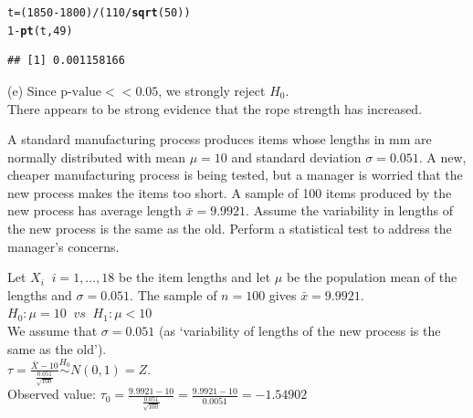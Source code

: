 \documentclass[bigtut]{tutorial}\usepackage[]{graphicx}\usepackage[]{color}
\makeatletter
\newcommand{\hlnum}[1]{\textcolor[rgb]{0.686,0.059,0.569}{#1}}%
\newcommand{\hlopt}[1]{\textcolor[rgb]{0,0,0}{#1}}%
\newcommand{\hlstd}[1]{\textcolor[rgb]{0.345,0.345,0.345}{#1}}%
\newcommand{\hlkwb}[1]{\textcolor[rgb]{0.69,0.353,0.396}{#1}}%
\newcommand{\hlkwd}[1]{\textcolor[rgb]{0.737,0.353,0.396}{\textbf{#1}}}%
\newenvironment{kframe}{%
 \def\at@end@of@kframe{}%
 \ifinner\ifhmode%
  \def\at@end@of@kframe{\end{minipage}}%
  \begin{minipage}{\columnwidth}%
 \fi\fi%
 \def\FrameCommand##1{\hskip\@totalleftmargin \hskip-\fboxsep
 \colorbox{shadecolor}{##1}\hskip-\fboxsep
     \hskip-\linewidth \hskip-\@totalleftmargin \hskip\columnwidth}%
 \MakeFramed {\advance\hsize-\width
   \@totalleftmargin\z@ \linewidth\hsize
   \@setminipage}}%
 {\par\unskip\endMakeFramed%
 \at@end@of@kframe}
\newenvironment{knitrout}{}{} %
\makeatother
\begin{document}
\begin{tutorial}
\begin{questions}
\begin{solution}
\begin{knitrout}
\color{fgcolor}\begin{kframe}
\begin{alltt}
\hlstd{t}\hlkwb{=}\hlstd{(}\hlnum{1850}\hlopt{-}\hlnum{1800}\hlstd{)}\hlopt{/}\hlstd{(}\hlnum{110}\hlopt{/}\hlkwd{sqrt}\hlstd{(}\hlnum{50}\hlstd{))}
\hlnum{1}\hlopt{-}\hlkwd{pt}\hlstd{(t,}\hlnum{49}\hlstd{)}
\end{alltt}
\begin{verbatim}
## [1] 0.001158166
\end{verbatim}
\end{kframe}
\end{knitrout}

\vspace{.5cm}
(e)
Since $\text{p-value} << 0.05$, we strongly reject $H_{0}$. \\
There appears to be strong evidence that the rope strength has increased.

\end{solution}



\question 
A standard manufacturing process produces items whose lengths in mm are normally distributed with mean $\mu=10$ and standard deviation $\sigma=0.051$. A new, cheaper manufacturing process is being tested, but a manager is worried that the new process makes the items too short. A sample of 100 items produced by the new process has average length $\bar{x}=9.9921$. Assume the variability in lengths of the new process is the same as the old.  Perform a statistical test to address the manager's concerns. 


\begin{solution}
Let $X_{i} \;\; i=1,\ldots,18$ be the item lengths and let $\mu$ be the population mean of the lengths and $\sigma=0.051$. The sample of $n=100$ gives $\bar{x}=9.9921$.\\

$H_0: \mu=10  \;\; vs \;\; H_1: \mu < 10$ \\

We assume that $\sigma = 0.051$ (as `variability of lengths of the new process is the same as the old').  \\

$\tau = \frac{ \bar{X} - 10}{\frac{0.051}{\sqrt{100}}} \overset{H_0}{\sim} N(0,1) = Z$. \\
Observed value: $\tau_{0} = \frac{9.9921-10}{\frac{0.051}{\sqrt{100}}} = \frac{9.9921-10}{0.0051}=  -1.54902$ \\


\end{solution}
\end{questions}
\end{tutorial}
\end{document}
